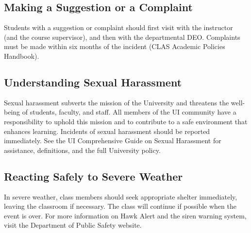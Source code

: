 \documentclass[10pt]{article}
\begin{document}
\subsection*{Making a Suggestion or a Complaint}
Students with a suggestion or complaint should first visit with the instructor
(and the course supervisor), and then with the departmental DEO. Complaints
must be made within six months of the incident (CLAS Academic Policies
Handbook).

\subsection*{Understanding Sexual Harassment}
Sexual harassment subverts the mission of the University and threatens the
well-being of students, faculty, and staff. All members of the UI community
have a responsibility to uphold this mission and to contribute to a safe
environment that enhances learning. Incidents of sexual harassment should be
reported immediately. See the UI Comprehensive Guide on Sexual Harassment for
assistance, definitions, and the full University policy.

\subsection*{Reacting Safely to Severe Weather}
In severe weather, class members should seek appropriate shelter immediately,
leaving the classroom if necessary. The class will continue if possible when
the event is over. For more information on Hawk Alert and the siren warning
system, visit the Department of Public Safety website.
\end{document}
